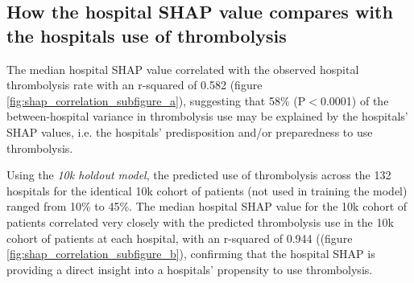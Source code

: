 \fi



\subsection{How the hospital SHAP value compares with the hospitals use of thrombolysis}

The median hospital SHAP value correlated with the observed hospital thrombolysis rate with an r-squared of 0.582 (figure \ref{fig:shap_correlation_subfigure_a}), suggesting that 58\% (P$<$0.0001) of the between-hospital variance in thrombolysis use may be explained by the hospitals' SHAP values, i.e. the hospitals' predisposition and/or preparedness to use thrombolysis.

Using the \emph{10k holdout model}, the predicted use of thrombolysis across the 132 hospitals for the identical 10k cohort of patients (not used in training the model) ranged from 10\% to 45\%. The median hospital SHAP value for the 10k cohort of patients correlated very closely with the predicted thrombolysis use in the 10k cohort of patients at each hospital, with an r-squared of 0.944 ((figure \ref{fig:shap_correlation_subfigure_b}), confirming that the hospital SHAP is providing a direct insight into a hospitals' propensity to use thrombolysis.

